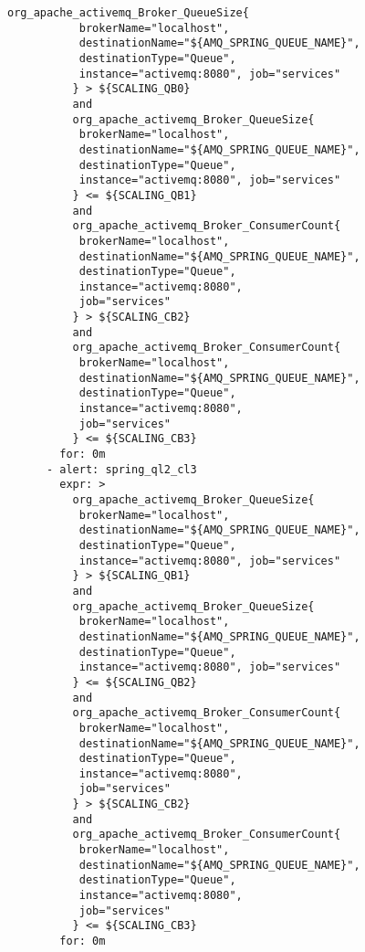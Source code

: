 \begin{lstlisting}[style=bashStyle,caption={alert-unparsed.yml},label=lst:alert-unparsed]
          org_apache_activemq_Broker_QueueSize{
           brokerName="localhost", 
           destinationName="${AMQ_SPRING_QUEUE_NAME}",
           destinationType="Queue", 
           instance="activemq:8080", job="services"
          } > ${SCALING_QB0}
          and 
          org_apache_activemq_Broker_QueueSize{
           brokerName="localhost", 
           destinationName="${AMQ_SPRING_QUEUE_NAME}",
           destinationType="Queue", 
           instance="activemq:8080", job="services"
          } <= ${SCALING_QB1}
          and 
          org_apache_activemq_Broker_ConsumerCount{
           brokerName="localhost",
           destinationName="${AMQ_SPRING_QUEUE_NAME}", 
           destinationType="Queue",
           instance="activemq:8080", 
           job="services"
          } > ${SCALING_CB2}
          and
          org_apache_activemq_Broker_ConsumerCount{
           brokerName="localhost",
           destinationName="${AMQ_SPRING_QUEUE_NAME}", 
           destinationType="Queue",
           instance="activemq:8080", 
           job="services"
          } <= ${SCALING_CB3}
        for: 0m
      - alert: spring_ql2_cl3
        expr: >
          org_apache_activemq_Broker_QueueSize{
           brokerName="localhost", 
           destinationName="${AMQ_SPRING_QUEUE_NAME}",
           destinationType="Queue", 
           instance="activemq:8080", job="services"
          } > ${SCALING_QB1}
          and 
          org_apache_activemq_Broker_QueueSize{
           brokerName="localhost", 
           destinationName="${AMQ_SPRING_QUEUE_NAME}",
           destinationType="Queue", 
           instance="activemq:8080", job="services"
          } <= ${SCALING_QB2}
          and 
          org_apache_activemq_Broker_ConsumerCount{
           brokerName="localhost",
           destinationName="${AMQ_SPRING_QUEUE_NAME}", 
           destinationType="Queue",
           instance="activemq:8080", 
           job="services"
          } > ${SCALING_CB2}
          and
          org_apache_activemq_Broker_ConsumerCount{
           brokerName="localhost",
           destinationName="${AMQ_SPRING_QUEUE_NAME}", 
           destinationType="Queue",
           instance="activemq:8080", 
           job="services"
          } <= ${SCALING_CB3}
        for: 0m


\end{lstlisting}
